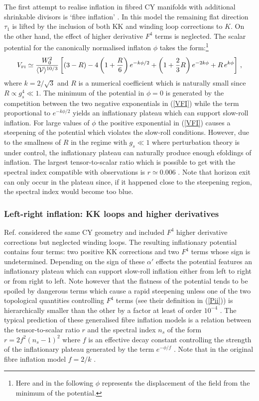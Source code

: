 \documentclass[11pt,a4paper]{article}
\newcommand{\be}{\begin{equation}}
\newcommand{\ee}{\end{equation}}
\def\FI{{\scriptscriptstyle \rm FI}}
\newcommand\vo{{\mathcal{V}}}
\begin{document}
The first attempt to realise inflation in fibred CY manifolds with additional shrinkable divisors is `fibre inflation' \cite{Cicoli:2008gp}. In this model the remaining flat direction $\tau_1$ is lifted by the inclusion of both KK and winding loop corrections to $K$. On the other hand, the effect of higher derivative $F^4$ terms is neglected. The scalar potential for the canonically normalised inflaton $\phi$ takes the form:\footnote{Here and in the following $\phi$ represents the displacement of the field from the minimum of the potential.}
\be
V_\FI \simeq \frac{W_0^2}{\langle \vo \rangle^{10/3}} \left[(3 - R) - 4 \left(1 + \frac{R}{6}\right) e^{- k \phi/2} + \left(1 + \frac{2}{3} R\right) e^{- 2 k \phi} + R \,e^{k \phi} \right]\,,
\label{VFI}
\ee
where $k = 2/\sqrt{3}$ and $R$ is a numerical coefficient which is naturally small since $R\propto g_s^4\ll 1$. The minimum of the potential in $\phi=0$ is generated by the competition between the two negative exponentials in (\ref{VFI}) while the term proportional to $e^{- k \phi/2}$ yields an inflationary plateau which can support slow-roll inflation. For large values of $\phi$ the positive exponential in (\ref{VFI}) causes a steepening of the potential which violates the slow-roll conditions. However, due to the smallness of $R$ in the regime with $g_s\ll 1$ where perturbation theory is under control, the inflationary plateau can naturally produce enough efoldings of inflation. The largest tensor-to-scalar ratio which is possible to get with the spectral index compatible with observations is $r \simeq 0.006$ \cite{Cicoli:2008gp}. Note that horizon exit can only occur in the plateau since, if it happened close to the steepening region, the spectral index would become too blue.


\subsubsection*{Left-right inflation: KK loops and higher derivatives}

Ref. \cite{Broy:2015zba} considered the same CY geometry and included $F^4$ higher derivative corrections but neglected winding loops. The resulting inflationary potential contains four terms: two positive KK corrections and two $F^4$ terms whose sign is undetermined. Depending on the sign of these $\alpha'$ effects the potential features an inflationary plateau which can support slow-roll inflation either from left to right or from right to left. Note however that the flatness of the potential tends to be spoiled by dangerous terms which cause a rapid steepening unless one of the two topological quantities controlling $F^4$ terms (see their definition in (\ref{Pii})) is hierarchically smaller than the other by a factor at least of order $10^{-4}$ \cite{Broy:2015zba}. The typical prediction of these generalised fibre inflation models is a relation between the tensor-to-scalar ratio $r$ and the spectral index $n_s$ of the form $r=2 f^2 \left(n_s-1\right)^2$ where $f$ is an effective decay constant controlling the strength of the inflationary plateau generated by the term $e^{-\phi/f}$ \cite{Burgess:2016owb}. Note that in the original fibre inflation model $f=2/k$ \cite{Cicoli:2008gp}. 
\end{document}
